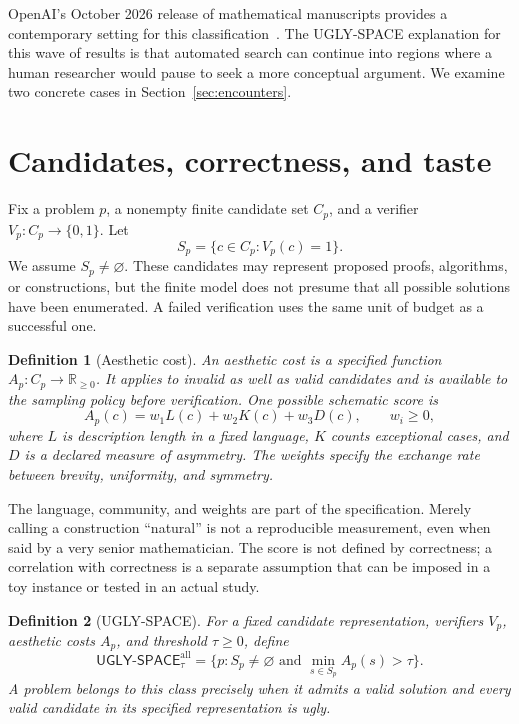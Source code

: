 \documentclass[11pt]{article}
\newtheorem{definition}{Definition}[section]
\theoremstyle{remark}
\newcommand{\ugly}{\mathsf{UGLY\text{-}SPACE}}
\begin{document}
OpenAI's October 2026 release of mathematical manuscripts provides a
contemporary setting for this classification~\cite{openai2026release}.
The UGLY-SPACE explanation for this wave of results is that automated search
can continue into regions where a human researcher would pause to seek a
more conceptual argument. We examine two concrete cases in
Section~\ref{sec:encounters}.

\section{Candidates, correctness, and taste}

Fix a problem $p$, a nonempty finite candidate set $C_p$, and a verifier
$V_p:C_p\to\{0,1\}$. Let
\[
 S_p=\{c\in C_p:V_p(c)=1\}.
\]
We assume $S_p\ne\varnothing$. These candidates may represent proposed
proofs, algorithms, or constructions, but the finite model does not presume
that all possible solutions have been enumerated. A failed verification
uses the same unit of budget as a successful one.

\begin{definition}[Aesthetic cost]
An aesthetic cost is a specified function $A_p:C_p\to\mathbb{R}_{\geq0}$.
It applies to invalid as well as valid candidates and is available to the
sampling policy before verification. One possible schematic score is
\[
 A_p(c)=w_1 L(c)+w_2 K(c)+w_3 D(c),\qquad w_i\geq0,
\]
where $L$ is description length in a fixed language, $K$ counts exceptional
cases, and $D$ is a declared measure of asymmetry. The weights specify the
exchange rate between brevity, uniformity, and symmetry.
\end{definition}

The language, community, and weights are part of the specification. Merely
calling a construction ``natural'' is not a reproducible measurement, even
when said by a very senior mathematician. The score is not defined by
correctness; a correlation with correctness is a separate assumption that
can be imposed in a toy instance or tested in an actual study.

\begin{definition}[UGLY-SPACE]\label{def:absolute}
For a fixed candidate representation, verifiers $V_p$, aesthetic costs
$A_p$, and threshold $\tau\geq0$, define
\[
 \ugly^{\mathrm{all}}_\tau
 =\{p:S_p\ne\varnothing\text{ and }\min_{s\in S_p}A_p(s)>\tau\}.
\]
A problem belongs to this class precisely when it admits a valid solution
and every valid candidate in its specified representation is ugly.
\end{definition}
\end{document}

